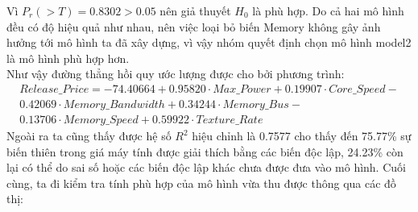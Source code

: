 \documentclass[a4paper]{article}
\newcommand{\gachdau}{\hspace*{1.5em}\ignorespaces}
\begin{document}
            \vspace{-16pt}
            \hspace{1pt}
            Vì $P_r (> T) = 0.8302 > 0.05$ nên giả thuyết $H_0$ là phù hợp. Do cả hai mô hình đều có độ hiệu quả như nhau, nên việc loại bỏ biến Memory không gây ảnh hưởng tới mô hình ta đã xây dựng, vì vậy nhóm quyết định chọn mô hình model2 là mô hình phù hợp hơn.\\
            \gachdau
            Như vậy đường thẳng hồi quy ước lượng được cho bởi phương trình:
            \vspace{-18pt}
            \begin{align*}
                Release\_Price = -74.40664 + 0.95820 \cdot Max\_Power + 0.19907 \cdot Core\_Speed -\\
                0.42069 \cdot Memory\_Bandwidth + 0.34244 \cdot Memory\_Bus -\\
                0.13706 \cdot Memory\_Speed + 0.59922 \cdot Texture\_Rate
            \end{align*}
\newpage
            \hspace{1pt}
            Ngoài ra ta cũng thấy được hệ số $R^2$ hiệu chỉnh là 0.7577 cho thấy đến 75.77\% sự biến thiên trong giá máy tính được giải thích bằng các biến độc lập, 24.23\% còn lại có thể do sai số hoặc các biến độc lập khác chưa được đưa vào mô hình.
            \gachdau
            Cuối cùng, ta đi kiểm tra tính phù hợp của mô hình vừa thu được thông qua các đồ thị:
\end{document}

